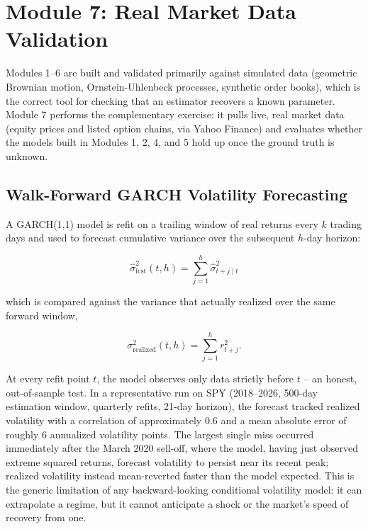 \documentclass[12pt,a4paper]{article}
\begin{document}
\section{Module 7: Real Market Data Validation}

Modules 1--6 are built and validated primarily against simulated data (geometric Brownian
motion, Ornstein-Uhlenbeck processes, synthetic order books), which is the correct tool for
checking that an estimator recovers a known parameter. Module 7 performs the complementary
exercise: it pulls live, real market data (equity prices and listed option chains, via Yahoo
Finance) and evaluates whether the models built in Modules 1, 2, 4, and 5 hold up once the
ground truth is unknown.

\subsection{Walk-Forward GARCH Volatility Forecasting}

A GARCH(1,1) model is refit on a trailing window of real returns every $k$ trading days and
used to forecast cumulative variance over the subsequent $h$-day horizon:

\begin{equation}
\hat{\sigma}^2_{\text{fcst}}(t, h) = \sum_{j=1}^{h} \hat{\sigma}^2_{t+j \mid t}
\end{equation}

which is compared against the variance that actually realized over the same forward window,

\begin{equation}
\sigma^2_{\text{realized}}(t, h) = \sum_{j=1}^{h} r_{t+j}^2 .
\end{equation}

At every refit point $t$, the model observes only data strictly before $t$ -- an honest,
out-of-sample test. In a representative run on SPY (2018--2026, 500-day estimation window,
quarterly refits, 21-day horizon), the forecast tracked realized volatility with a
correlation of approximately $0.6$ and a mean absolute error of roughly $6$ annualized
volatility points. The largest single miss occurred immediately after the March 2020 sell-off,
where the model, having just observed extreme squared returns, forecast volatility to persist
near its recent peak; realized volatility instead mean-reverted faster than the model
expected. This is the generic limitation of any backward-looking conditional volatility
model: it can extrapolate a regime, but it cannot anticipate a shock or the market's speed of
recovery from one.
\end{document}
